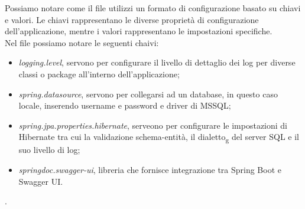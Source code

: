 \noindent Possiamo notare come il file utilizzi un formato di configurazione basato su chiavi e valori. Le chiavi rappresentano le diverse proprietà di configurazione dell'applicazione, mentre i valori rappresentano le impostazioni specifiche.\\
Nel file possiamo notare le seguenti chaivi:
\begin{itemize}
\item \textit{logging.level}, servono per configurare il livello di dettaglio dei log per diverse classi o package all'interno dell'applicazione;
\item \textit{spring.datasource}, servono per collegarsi ad un database, in questo caso locale, inserendo username e password e driver di MSSQL;
\item \textit{spring.jpa.properties.hibernate}, serveono per configurare le impostazioni di Hibernate tra cui la validazione schema-entità, il dialetto\textsubscript{g} del server SQL e il suo livello di log;
\item \textit{springdoc.swagger-ui}, libreria che fornisce integrazione tra Spring Boot e Swagger UI.  
\end{itemize}. 